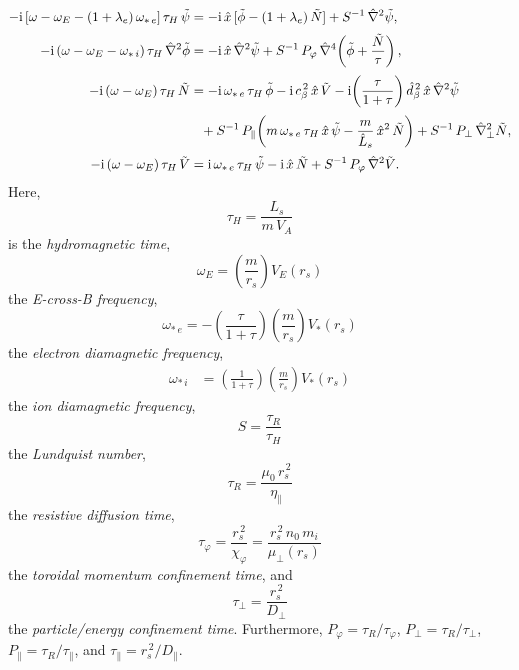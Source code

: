 \documentclass[notitlepage,12pt]{article}
\begin{document}
\begin{align}\label{e301}
-{\rm i}\,[\omega-\omega_E -(1+\lambda_e)\,\omega_{\ast\,e}]\,\tau_H\,\tilde{\psi} &= -{\rm i} \,\hat{x}\,[\tilde{\phi}-(1+\lambda_e)\,\tilde{N}] + S^{-1}\,\hat{\nabla}^2\tilde{\psi},\\[0.5ex]
-{\rm i}\,(\omega-\omega_E-\omega_{\ast\,i})\,\tau_H\,\hat{\nabla}^2\tilde{\phi} &= -{\rm i}\,\hat{x}\,\hat{\nabla}^2\tilde{\psi}+S^{-1}\,P_\varphi\,\hat{\nabla}^4\!\left(\tilde{\phi} + \frac{\tilde{N}}{\tau}\right),\\[0.5ex]
-{\rm i}\,(\omega-\omega_E)\,\tau_H\,\tilde{N} &= -{\rm i}\,\omega_{\ast\,e}\,\tau_H\,\tilde{\phi}-{\rm i}\,c_\beta^{\,2}\,\hat{x}\,\tilde{V} - {\rm i}\!\left(\frac{\tau}{1+\tau}\right)\hat{d}_\beta^{\,2}\,\hat{x}\,\hat{\nabla}^2\tilde{\psi} \\[0.5ex]
&\phantom{=}
+S^{-1}\,P_\parallel\!\left(m\,\omega_{\ast\,e}\,\tau_H\,\hat{x}\,\tilde{\psi}-\frac{m}{\hat{L}_s}\,\hat{x}^2\,\tilde{N}\right)
+ S^{-1}\,P_\perp\,\hat{\nabla}_\perp^2 \tilde{N},\nonumber\\[0.5ex]
-{\rm i}\,(\omega-\omega_E)\,\tau_H\,\tilde{V} &= {\rm i}\,\omega_{\ast\,e}\,\tau_H\,\tilde{\psi} - {\rm i}\,\hat{x}\,\tilde{N}
+ S^{-1}\,P_\varphi\,\hat{\nabla}^2\tilde{V}.\label{e304}
\end{align}
Here, 
\begin{equation}\label{e313a}
\tau_H = \frac{L_s}{m\,V_A}
\end{equation}
is the {\em hydromagnetic time}, 
\begin{equation}
\omega_E = \left(\frac{m}{r_s}\right)V_E(r_s)
\end{equation}
  the 
{\em E-cross-B frequency}, 
\begin{equation}
\omega_{\ast\,e} = -\left(\frac{\tau}{1+\tau}\right)\left(\frac{m}{r_s}\right)V_\ast(r_s)
\end{equation}
  the {\em electron diamagnetic
frequency},
\begin{align}\label{omegai}
  \omega_{\ast\,i} &= \left(\frac{1}{1+\tau}\right)\left(\frac{m}{r_s}\right)V_\ast(r_s)
  \end{align}
    the {\em ion diamagnetic
frequency}, 
\begin{equation}
S=\frac{\tau_R}{\tau_H}
\end{equation}
 the {\em Lundquist number}, 
\begin{equation}\label{e317a}
\tau_R = \frac{\mu_0\,r_s^{\,2}}{\eta_\parallel}
\end{equation}
 the
{\em resistive diffusion time}, 
\begin{equation}\label{e318a}
\tau_\varphi
= \frac{r_s^{\,2}}{\chi_\varphi}=\frac{r_s^{\,2}\,n_0\,m_i}{\mu_\perp(r_s)}
\end{equation} 
the {\em toroidal momentum confinement time}, and 
\begin{equation}
\tau_\perp = \frac{r_s^{\,2}}{D_\perp}
\end{equation}
 the {\em particle/energy confinement time}. Furthermore, $P_\varphi = \tau_R/\tau_\varphi$, $P_\perp = \tau_R/\tau_\perp$, 
$P_\parallel=\tau_R/\tau_\parallel$, and $\tau_\parallel =r_s^{\,2}/D_\parallel$.
\end{document}
